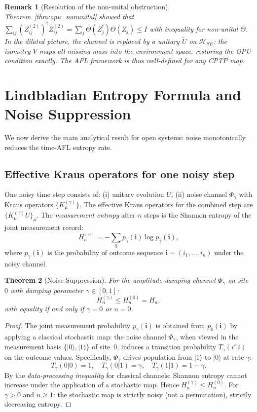 \documentclass[12pt,a4paper]{article}
\newtheorem{theorem}{Theorem}[section]
\newtheorem{remark}[theorem]{Remark}
\begin{document}
\begin{remark}[Resolution of the non-unital obstruction]
Theorem~\ref{thm:opu_nonunital} showed that $\sum_{ij}(Z^{(2)}_{ij})^{\dagger}Z^{(2)}_{ij}
=\sum_j\Theta(Z_j^{\dagger})\Theta(Z_j)\leq I$ with inequality for non-unital
$\Theta$.  In the dilated picture, the channel is replaced by a
\emph{unitary} $\widetilde{U}$ on $\mathcal{H}_{SE}$: the isometry
$V$ maps all missing mass into the environment space, restoring the OPU
condition exactly.  The AFL framework is thus well-defined for any CPTP map.
\end{remark}

\section{Lindbladian Entropy Formula and Noise Suppression}
\label{sec:noise_formula}

We now derive the main analytical result for open systems: noise
monotonically reduces the time-AFL entropy rate.

\subsection{Effective Kraus operators for one noisy step}

One noisy time step consists of: (i) unitary evolution $U$, (ii) noise
channel $\Phi_{\gamma}$ with Kraus operators $\{K_{\mu}^{(\gamma)}\}$.
The effective Kraus operators for the combined step are
$\{K_{\mu}^{(\gamma)}U\}_{\mu}$.  The \emph{measurement entropy} after $n$
steps is the Shannon entropy of the joint measurement record:
\[
  H_n^{(\gamma)} = -\sum_{\mathbf{i}}p_{\gamma}(\mathbf{i})\log p_{\gamma}(\mathbf{i}),
\]
where $p_{\gamma}(\mathbf{i})$ is the probability of outcome sequence
$\mathbf{i}=(i_1,\ldots,i_n)$ under the noisy channel.

\begin{theorem}[Noise Suppression]
\label{thm:noise_suppress}
For the amplitude-damping channel $\Phi_{\gamma}$ on site~$0$ with damping
parameter $\gamma\in[0,1]$:
\[
  H_n^{(\gamma)} \leq H_n^{(0)} = H_n,
\]
with equality if and only if $\gamma=0$ or $n=0$.
\end{theorem}
\begin{proof}
The joint measurement probability $p_{\gamma}(\mathbf{i})$ is obtained from
$p_0(\mathbf{i})$ by applying a classical stochastic map: the noise channel
$\Phi_{\gamma}$, when viewed in the measurement basis $\{|0\rangle,|1\rangle\}$
of site~$0$, induces a transition probability $T_{\gamma}(i'|i)$ on the
outcome values.  Specifically, $\Phi_{\gamma}$ drives population from
$|1\rangle$ to $|0\rangle$ at rate $\gamma$:
\[
  T_{\gamma}(0|0)=1,\quad T_{\gamma}(0|1)=\gamma,\quad T_{\gamma}(1|1)=1-\gamma.
\]
By the \emph{data-processing inequality} for classical channels:
Shannon entropy cannot increase under the application of a stochastic map.
Hence $H_n^{(\gamma)}\leq H_n^{(0)}$.
For $\gamma>0$ and $n\geq 1$: the stochastic map is strictly noisy (not a
permutation), strictly decreasing entropy.
\end{proof}
\end{document}
